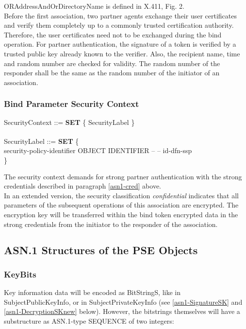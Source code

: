 ORAddressAndOrDirectoryName is defined in X.411, Fig. 2.
\\ [1em]
Before the first association,
two partner agents exchange their user certificates
and verify them completely up to a commonly
trusted certification authority.
Therefore, the user certificates need not to be exchanged
during the bind operation.
For partner authentication,
the signature of a token is verified by a trusted public key
already known to the verifier.
Also, the recipient name, time and random number are checked
for validity.
The random number of the responder shall be the same
as the random number of the initiator of an association.

\subsubsection{Bind Parameter Security Context}
\label{asn1-context}

{\small
\btab
\1 SecurityContext ::= {\bf SET} \{ SecurityLabel \} \\
\\
\1 SecurityLabel ::= {\bf SET} \{ \\
\2   security-policy-identifier \3 OBJECT IDENTIFIER -- -- id-dfn-ssp \\
\2   \}
\etab
}

The security context demands for strong partner authentication
with the strong credentials described in paragraph \ref{asn1-cred} above.
\\
In an extended version,
the security classification {\em confidential} indicates
that all parameters of the subsequent operations of this association
are encrypted.
The encryption key will be transferred
within the bind token encrypted data
in the strong credentials
from the initiator to the responder of the association.

\subsection{ASN.1 Structures of the PSE Objects}
\label{asn1-sw-cc}

\subsubsection{KeyBits}
\label{asn1-KeyBits}

Key information data will be encoded as BitStringS,
like in Subject\-Public\-Key\-Info, or in SubjectPrivateKeyInfo
(see \ref{asn1-SignatureSK} and \ref{asn1-DecryptionSKnew} below).
However, the bitstrings themselves will have a substructure
as ASN.1-type SEQUENCE of two integers:

